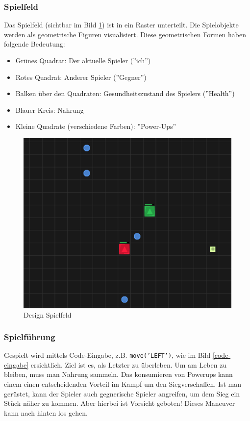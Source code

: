 \documentclass[11pt,a4paper,titlepage]{article}
\begin{document}
\subsubsection{Spielfeld}

Das Spielfeld (sichtbar im Bild \ref{spielfeld}) ist in ein Raster unterteilt. Die Spielobjekte werden als geometrische Figuren visualisiert. Diese geometrischen Formen haben folgende Bedeutung:
\begin{itemize}
\item Grünes Quadrat: Der aktuelle Spieler (''ich'')
\item Rotes Quadrat: Anderer Spieler (''Gegner'')
\item Balken über den Quadraten: Gesundheitszustand des Spielers (''Health'')
\item Blauer Kreis: Nahrung
\item Kleine Quadrate (verschiedene Farben): ''Power-Ups''
\end{itemize}

\begin{figure}[H]
	\centering
	\includegraphics[width=\textwidth]{game1.png}
	\caption{Design Spielfeld}
	\label{spielfeld}
\end{figure}

\subsubsection{Spielführung}

Gespielt wird mittels Code-Eingabe, z.B. \texttt{move('LEFT')}, wie im Bild \ref{code-eingabe} ersichtlich. Ziel ist es, als Letzter zu überleben. Um am Leben zu bleiben, muss man Nahrung sammeln. Das konsumieren von Powerups kann einem einen entscheidenden Vorteil im Kampf um den Siegverschaffen. Ist man gerüstet, kann der Spieler auch gegnerische Spieler angreifen, um dem Sieg ein Stück näher zu kommen. Aber hierbei ist Vorsicht geboten! Dieses Maneuver kann nach hinten los gehen.
\end{document}
